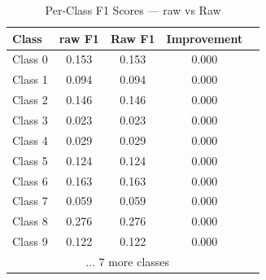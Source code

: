 \begin{table}[htbp]
\centering
\caption{Per-Class F1 Scores — raw vs Raw}
\label{tab:perclass_f1}
\begin{tabular}{lcccc}
\toprule
Class & raw F1 & Raw F1 & Improvement \\
\midrule
Class 0 & 0.153 & 0.153 & 0.000 \\
Class 1 & 0.094 & 0.094 & 0.000 \\
Class 2 & 0.146 & 0.146 & 0.000 \\
Class 3 & 0.023 & 0.023 & 0.000 \\
Class 4 & 0.029 & 0.029 & 0.000 \\
Class 5 & 0.124 & 0.124 & 0.000 \\
Class 6 & 0.163 & 0.163 & 0.000 \\
Class 7 & 0.059 & 0.059 & 0.000 \\
Class 8 & 0.276 & 0.276 & 0.000 \\
Class 9 & 0.122 & 0.122 & 0.000 \\
\midrule
\multicolumn{4}{c}{... 7 more classes} \\
\bottomrule
\end{tabular}
\end{table}